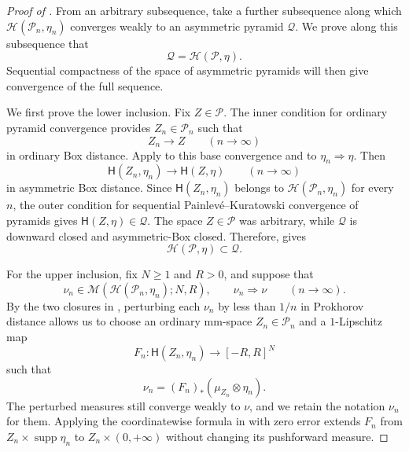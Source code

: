 \documentclass{amsart}
\numberwithin{equation}{section}
\theoremstyle{plain}
\theoremstyle{definition}
\theoremstyle{remark}
\DeclareMathOperator{\supp}{supp}
\begin{document}
\begin{proof}[Proof of ]
From an arbitrary subsequence, take a further subsequence along which
$\mathcal H(\mathcal P_n,\eta_n)$ converges weakly to an asymmetric pyramid $\mathcal Q$.  We prove along this
subsequence that
\[
 \mathcal Q=\mathcal H(\mathcal P,\eta).
\]
Sequential compactness of the space of asymmetric pyramids will then give convergence of the full sequence.

We first prove the lower inclusion.  Fix $Z\in\mathcal P$.  The inner condition for ordinary pyramid convergence
provides $Z_n\in\mathcal P_n$ such that
\[
 Z_n\longrightarrow Z\qquad(n\to\infty)
\]
in ordinary Box distance.  Apply  to this base convergence and to
$\eta_n\Rightarrow\eta$.  Then
\[
 \mathsf H(Z_n,\eta_n)
 \longrightarrow
 \mathsf H(Z,\eta)
 \qquad(n\to\infty)
\]
in asymmetric Box distance.  Since $\mathsf H(Z_n,\eta_n)$ belongs to
$\mathcal H(\mathcal P_n,\eta_n)$ for every $n$, the outer condition for sequential Painlev\'e--Kuratowski
convergence of pyramids gives $\mathsf H(Z,\eta)\in\mathcal Q$.  The space $Z\in\mathcal P$ was arbitrary, while
$\mathcal Q$ is downward closed and asymmetric-Box closed.  Therefore,  gives
\begin{equation}\label{eq:joint-horocone-lower-inclusion}
 \mathcal H(\mathcal P,\eta)\subset\mathcal Q.
\end{equation}

For the upper inclusion, fix $N\ge1$ and $R>0$, and suppose that
\[
 \nu_n\in
 \mathcal M(\mathcal H(\mathcal P_n,\eta_n);N,R),
 \qquad
 \nu_n\Rightarrow\nu
 \qquad(n\to\infty).
\]
By the two closures in , perturbing each $\nu_n$
by less than $1/n$ in Prokhorov distance allows us to choose an ordinary mm-space $Z_n\in\mathcal P_n$ and a
$1$-Lipschitz map
\[
 F_n\colon\mathsf H(Z_n,\eta_n)\longrightarrow[-R,R]^N
\]
such that
\begin{equation}\label{eq:joint-measurement-realization}
 \nu_n=(F_n)_*(\mu_{Z_n}\otimes\eta_n).
\end{equation}
The perturbed measures still converge weakly to $\nu$, and we retain the notation $\nu_n$ for them.  Applying the
coordinatewise formula in  with zero error extends $F_n$ from
$Z_n\times\supp\eta_n$ to $Z_n\times(0,+\infty)$ without changing its pushforward measure.


\end{proof}
\end{document}
